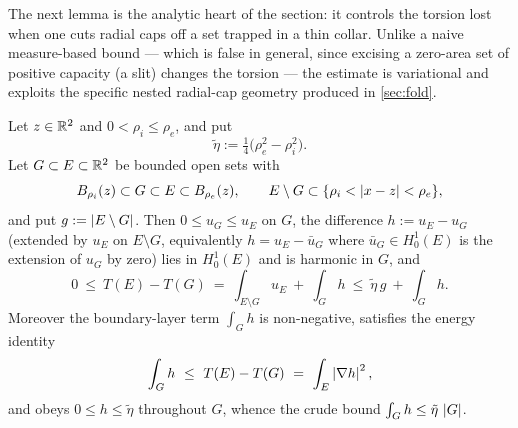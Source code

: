 The next lemma is the analytic heart of the section: it controls the torsion
lost when one cuts radial caps off a set trapped in a thin collar. Unlike a
naive measure-based bound --- which is false in general, since excising a
zero-area set of positive capacity (a slit) changes the torsion --- the
estimate is variational and exploits the specific nested radial-cap geometry
produced in \cref{sec:fold}.

\begin{lemma}\label{lem:torsion-stab}
Let $z\in\mathbb{R}^2$ and $0<\rho_i\le\rho_e$, and put
\begin{equation}\label{eq:tildeeta}
   \tilde\eta:=\tfrac14\bigl(\rho_e^2-\rho_i^2\bigr).
\end{equation}
Let $G\subset E\subset\mathbb{R}^2$ be bounded open sets with
\begin{equation}\label{eq:collar-hyp}
   B_{\rho_i}(z)\subset G\subset E\subset B_{\rho_e}(z),\qquad
   E\setminus G\subset\{\rho_i<\left\lvert x-z\right\rvert<\rho_e\},
\end{equation}
and put $g:=\left\lvert E\setminus G\right\rvert$. Then $0\le u_G\le u_E$ on $G$, the
difference $h:=u_E-u_G$ \textup(extended by $u_E$ on $E\setminus G$, equivalently
$h=u_E-\bar u_G$ where $\bar u_G\in H^1_0(E)$ is the extension of $u_G$ by
zero\textup) lies in $H^1_0(E)$ and is harmonic in $G$, and
\begin{equation}\label{eq:torsion-loss}
   0\ \le\ T(E)-T(G)
   \ =\ \int_{E\setminus G}u_E\ +\ \int_G h
   \ \le\ \tilde\eta\,g\ +\ \int_G h .
\end{equation}
Moreover the boundary-layer term $\int_G h$ is non-negative, satisfies the
energy identity
\begin{equation}\label{eq:energy-id}
   \int_G h\ \le\ T(E)-T(G)\ =\ \int_E\left\lvert\nabla h\right\rvert^2,
\end{equation}
and obeys $0\le h\le\tilde\eta$ throughout $G$, whence the crude bound
$\int_G h\le\tilde\eta\,\left\lvert G\right\rvert$.
\end{lemma}

